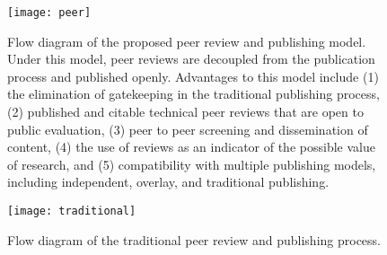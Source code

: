 \documentclass{article}
\begin{document}
\begin{figure}[!h]
  \centering
  \texttt{[image: peer]}
  \caption{Flow diagram of the proposed peer review and publishing model. Under this model, peer reviews are decoupled from the publication process and published openly. Advantages to this model include (1) the elimination of gatekeeping in the traditional publishing process, (2) published and citable technical peer reviews that are open to public evaluation, (3) peer to peer screening and dissemination of content, (4) the use of reviews as an indicator of the possible value of research, and (5) compatibility with multiple publishing models, including independent, overlay, and traditional publishing.\label{fig:peer}}
\end{figure}

\begin{figure}[!h]
  \centering
  \texttt{[image: traditional]}
  \caption{Flow diagram of the traditional peer review and publishing process.\label{fig:traditional}}
\end{figure}



\end{document}
